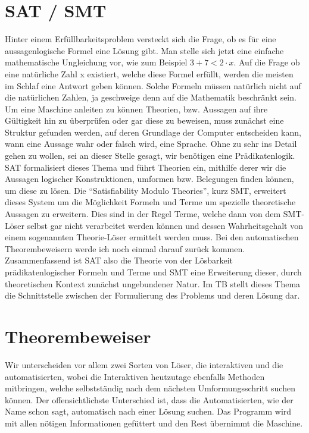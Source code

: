 \section{SAT / SMT}
Hinter einem Erfüllbarkeitsproblem versteckt sich die Frage, ob es für eine aussagenlogische Formel eine Lösung gibt. Man stelle sich jetzt eine einfache
mathematische Ungleichung vor, wie zum Beispiel $3+7<2 \cdot x$. Auf die Frage ob eine natürliche Zahl x existiert, welche diese Formel erfüllt, werden die meisten im Schlaf
eine Antwort geben können. Solche Formeln müssen natürlich nicht auf die natürlichen Zahlen, ja geschweige denn auf die Mathematik beschränkt sein.
Um eine Maschine anleiten zu können Theorien, bzw. Aussagen auf ihre Gültigkeit hin zu überprüfen oder gar diese zu beweisen, muss zunächst eine Struktur
gefunden werden, auf deren Grundlage der Computer entscheiden kann, wann eine Aussage wahr oder falsch wird, eine Sprache. Ohne zu sehr ins Detail gehen zu
wollen, sei an dieser Stelle gesagt, wir benötigen eine Prädikatenlogik. SAT formalisiert dieses Thema und führt Theorien ein, mithilfe derer wir die Aussagen
logischer Konstruktionen, umformen bzw. Belegungen finden können, um diese zu lösen.
Die \enquote{Satisfiability Modulo Theories}, kurz SMT, erweitert dieses System um die Möglichkeit Formeln und Terme um spezielle theoretische Aussagen zu erweitern.
Dies sind in der Regel Terme, welche dann von dem SMT-Löser selbst gar nicht verarbeitet werden können und dessen Wahrheitsgehalt von einem sogenannten
Theorie-Löser ermittelt werden muss. Bei den automatischen Theorembeweisern werde ich noch einmal darauf zurück kommen.
Zusammenfassend ist SAT also die Theorie von der Lösbarkeit prädikatenlogischer Formeln und Terme und SMT eine Erweiterung dieser, durch theoretischen Kontext zunächst ungebundener Natur. Im TB stellt dieses Thema die Schnittstelle zwischen der Formulierung des Problems und deren Lösung dar.

\section{Theorembeweiser}
Wir unterscheiden vor allem zwei Sorten von Löser, die interaktiven und die automatisierten, wobei die Interaktiven heutzutage ebenfalls Methoden mitbringen, welche selbstständig nach dem nächsten Umformungsschritt suchen können. Der offensichtlichste Unterschied ist, dass die Automatisierten, wie der Name schon sagt, automatisch nach einer Lösung suchen. Das Programm wird mit allen nötigen Informationen gefüttert und den Rest übernimmt die Maschine.


